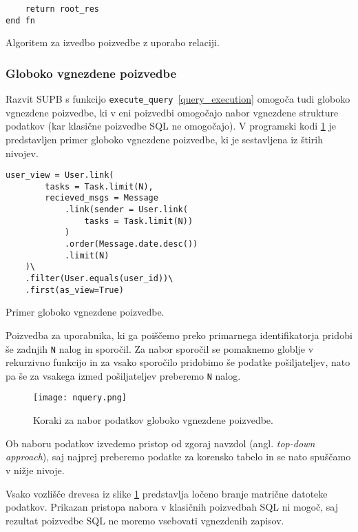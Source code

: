 \documentclass[a4paper,12pt,openright]{book}
\begin{document}
\begin{itemize}
\begin{code}
\begin{verbatim}
    return root_res
end fn
\end{verbatim}
\caption{Algoritem za izvedbo poizvedbe z uporabo relaciji.}
\label{execute_query_algorithm}
\end{code}

        \newpage
        \subsubsection{Globoko vgnezdene poizvedbe}

        Razvit SUPB s funkcijo {\tt execute\_query}~\ref{query_execution} omogoča tudi globoko vgnezdene poizvedbe, ki v eni poizvedbi omogočajo nabor vgnezdene strukture podatkov (kar klasične poizvedbe SQL ne omogočajo). V programski kodi \ref{deep_nested_query} je predstavljen primer globoko vgnezdene poizvedbe, ki je sestavljena iz štirih nivojev.

\newpage
\begin{code}
\begin{verbatim}
user_view = User.link(
        tasks = Task.limit(N),
        recieved_msgs = Message
            .link(sender = User.link(
                tasks = Task.limit(N))
            )
            .order(Message.date.desc())
            .limit(N)
    )\
    .filter(User.equals(user_id))\
    .first(as_view=True)
\end{verbatim}
\caption{Primer globoko vgnezdene poizvedbe.}
\label{deep_nested_query}
\end{code}

        Poizvedba za uporabnika, ki ga poiščemo preko primarnega identifikatorja pridobi še zadnjih {\tt N} nalog in sporočil. Za nabor sporočil se pomaknemo globlje v rekurzivno funkcijo in za vsako sporočilo pridobimo še podatke pošiljateljev, nato pa še za vsakega izmed pošiljateljev preberemo {\tt N} nalog.

        \begin{figure}[H]
            \centerline{\texttt{[image: nquery.png]}}
            \caption{Koraki za nabor podatkov globoko vgnezdene poizvedbe.}
            \label{deep_nested_query}
        \end{figure}

        Ob naboru podatkov izvedemo pristop od zgoraj navzdol (angl. \textit{top-down approach}), saj najprej preberemo podatke za korensko tabelo in se nato spuščamo v nižje nivoje.

        Vsako vozlišče drevesa iz slike \ref{deep_nested_query} predstavlja ločeno branje matrične datoteke podatkov. Prikazan pristopa nabora v klasičnih poizvedbah SQL ni mogoč, saj rezultat poizvedbe SQL ne moremo vsebovati vgnezdenih zapisov.


\end{itemize}
\end{document}
